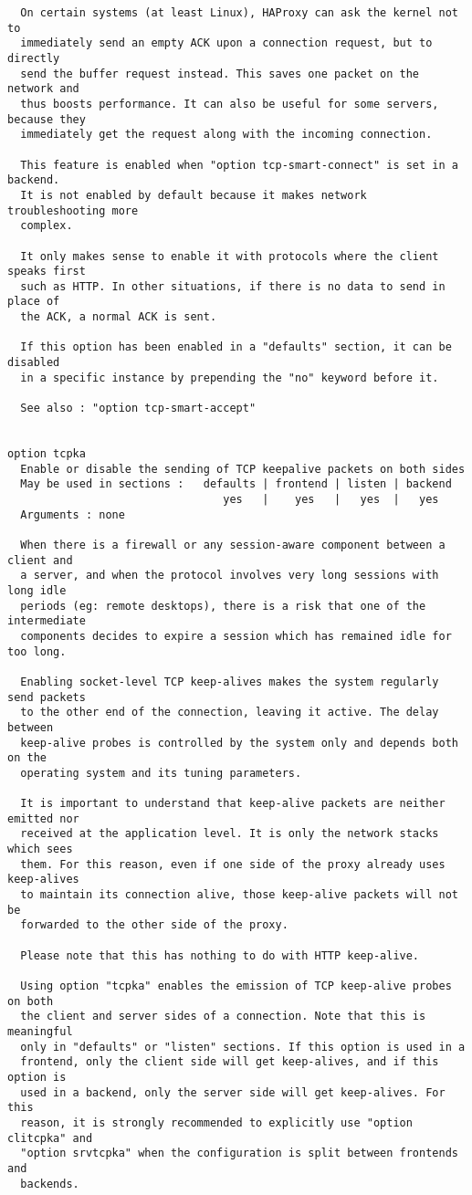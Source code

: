 \begin{verbatim}
  On certain systems (at least Linux), HAProxy can ask the kernel not to
  immediately send an empty ACK upon a connection request, but to directly
  send the buffer request instead. This saves one packet on the network and
  thus boosts performance. It can also be useful for some servers, because they
  immediately get the request along with the incoming connection.

  This feature is enabled when "option tcp-smart-connect" is set in a backend.
  It is not enabled by default because it makes network troubleshooting more
  complex.

  It only makes sense to enable it with protocols where the client speaks first
  such as HTTP. In other situations, if there is no data to send in place of
  the ACK, a normal ACK is sent.

  If this option has been enabled in a "defaults" section, it can be disabled
  in a specific instance by prepending the "no" keyword before it.

  See also : "option tcp-smart-accept"


option tcpka
  Enable or disable the sending of TCP keepalive packets on both sides
  May be used in sections :   defaults | frontend | listen | backend
                                 yes   |    yes   |   yes  |   yes
  Arguments : none

  When there is a firewall or any session-aware component between a client and
  a server, and when the protocol involves very long sessions with long idle
  periods (eg: remote desktops), there is a risk that one of the intermediate
  components decides to expire a session which has remained idle for too long.

  Enabling socket-level TCP keep-alives makes the system regularly send packets
  to the other end of the connection, leaving it active. The delay between
  keep-alive probes is controlled by the system only and depends both on the
  operating system and its tuning parameters.

  It is important to understand that keep-alive packets are neither emitted nor
  received at the application level. It is only the network stacks which sees
  them. For this reason, even if one side of the proxy already uses keep-alives
  to maintain its connection alive, those keep-alive packets will not be
  forwarded to the other side of the proxy.

  Please note that this has nothing to do with HTTP keep-alive.

  Using option "tcpka" enables the emission of TCP keep-alive probes on both
  the client and server sides of a connection. Note that this is meaningful
  only in "defaults" or "listen" sections. If this option is used in a
  frontend, only the client side will get keep-alives, and if this option is
  used in a backend, only the server side will get keep-alives. For this
  reason, it is strongly recommended to explicitly use "option clitcpka" and
  "option srvtcpka" when the configuration is split between frontends and
  backends.


\end{verbatim}
